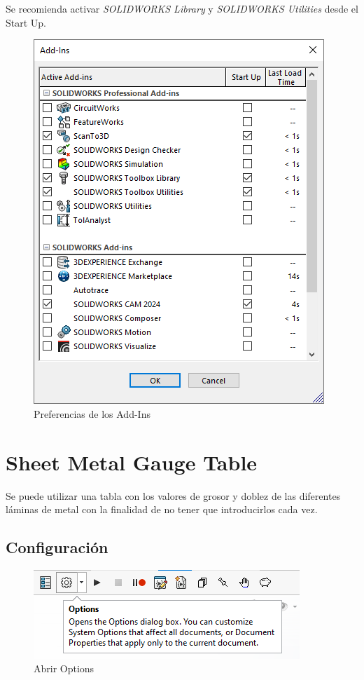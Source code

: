 \documentclass[12pt,letterpaper,final]{report}
\begin{document}
Se recomienda activar \emph{SOLIDWORKS Library} y \emph{SOLIDWORKS Utilities} desde el Start Up.

\begin{figure}[H]
	\centering
	\includegraphics[width=0.85\linewidth, height=0.5\textheight,keepaspectratio]{Imagenes/solidworks_addin_02}
	\caption{Preferencias de los Add-Ins}
	\label{fig:solidworksaddin02}
\end{figure}

\chapter{Sheet Metal Gauge Table}

Se puede utilizar una tabla con los valores de grosor y doblez de las diferentes láminas de metal con la finalidad de no tener que introducirlos cada vez. 

\section{Configuración}

\begin{figure}[H]
	\centering
	\includegraphics[width=0.85\linewidth, height=0.5\textheight,keepaspectratio]{Imagenes/solidworks_sheetmetalgauge_01}
	\caption{Abrir Options}
	\label{fig:solidworkssheetmetalgauge01}
\end{figure}
\end{document}
